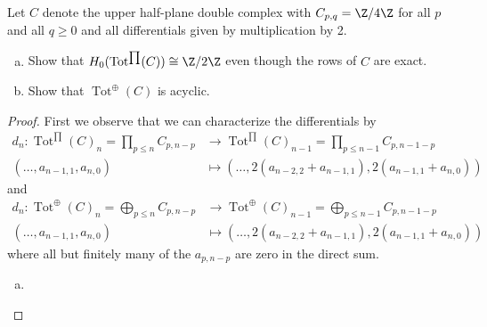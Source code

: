 \documentclass[10pt]{amsart}
\begin{document}
\begin{ex}
  Let $C$ denote the upper half-plane double complex with $C_{p,q} = \Z/4\Z$ for all $p$ and all $q \geq 0$ and all differentials given by multiplication by 2.
  \begin{enumerate}[(a)]
  \item
    Show that $H_0(\operatorname{Tot}^{\prod}(C)) \cong \Z/2\Z$ even though the rows of $C$ are exact.
  \item
    Show that $\operatorname{Tot}^{\oplus}(C)$ is acyclic.
  \end{enumerate}
  \begin{proof}
          First we observe that we can characterize the differentials by
          \begin{align*}
            d_n \colon \operatorname{Tot}^{\prod}(C)_n = \prod_{p \leq n} C_{p,n-p} &\rightarrow \operatorname{Tot}^{\prod}(C)_{n-1} = \prod_{p \leq n - 1} C_{p,n - 1 - p}\\
            (\ldots, a_{n-1, 1}, a_{n, 0}) &\mapsto (\ldots, 2(a_{n-2,2} + a_{n - 1,1}), 2(a_{n - 1,1} + a_{n,0}))
          \end{align*}
      and
      \begin{align*}
        d_n \colon \operatorname{Tot}^{\oplus}(C)_n = \bigoplus_{p \leq n} C_{p,n-p} &\rightarrow \operatorname{Tot}^{\oplus}(C)_{n-1} = \bigoplus_{p \leq n - 1} C_{p,n - 1 - p}\\
        (\ldots, a_{n-1, 1}, a_{n, 0}) &\mapsto (\ldots, 2(a_{n-2,2} + a_{n - 1,1}), 2(a_{n - 1,1} + a_{n,0}))
      \end{align*}
      where all but finitely many of the $a_{p,n-p}$ are zero in the direct sum.
    \begin{enumerate}[(a)]
    \item

\end{enumerate}
\end{proof}
\end{ex}
\end{document}
